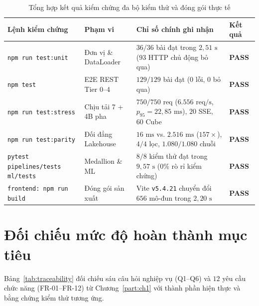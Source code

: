 \begin{table}[H]
	\centering
	\caption{Tổng hợp kết quả kiểm chứng đa bộ kiểm thử và đóng gói thực tế}
	\label{tab:multi-suite-results}
	\footnotesize
	\begin{tabular}{l l p{5.5cm} l}
		\toprule
		\textbf{Lệnh kiểm chứng}                           & \textbf{Phạm vi}     & \textbf{Chỉ số chính ghi nhận}                                                        & \textbf{Kết quả} \\
		\midrule
		\texttt{npm run test:unit}               & Đơn vị \& DataLoader & $36/36$ bài đạt trong $2{,}51\text{ s}$ ($93$ HTTP chủ động bỏ qua)                   & \textbf{PASS}    \\
		\texttt{npm test}                        & E2E REST Tier 0--4   & $129/129$ bài đạt ($0$ lỗi, $0$ bỏ qua)                                               & \textbf{PASS}    \\
		\texttt{npm run test:stress}             & Chịu tải 7 + 4B pha  & $750/750$ req ($6.556\text{ req/s}$, $p_{95}=22{,}85\text{ ms}$), $20$ SSE, $60$ Cube & \textbf{PASS}    \\
		\texttt{npm run test:parity}             & Đối đẳng Lakehouse   & $16\text{ ms}$ vs. $2.516\text{ ms}$ ($157\times$), $4/4$ lọc, $1.080/1.080$ chuỗi    & \textbf{PASS}    \\
		\texttt{pytest pipelines/tests ml/tests} & Medallion \& ML      & $8/8$ kiểm thử đạt trong $9{,}57\text{ s}$ ($0\%$ rò rỉ kiểm chứng)                   & \textbf{PASS}    \\
		\texttt{frontend: npm run build}         & Đóng gói sản xuất    & Vite \texttt{v5.4.21} chuyển đổi $656$ mô-đun trong $2{,}20\text{ s}$       & \textbf{PASS}    \\
		\bottomrule
	\end{tabular}
\end{table}

\section{Đối chiếu mức độ hoàn thành mục tiêu}
\label{sec:ch6-traceability}
Bảng~\ref{tab:traceability} đối chiếu sáu câu hỏi nghiệp vụ (Q1--Q6) và $12$ yêu cầu chức năng (FR-01--FR-12) từ Chương~\ref{part:ch1} với thành phần hiện thực và bằng chứng kiểm thử tương ứng.

